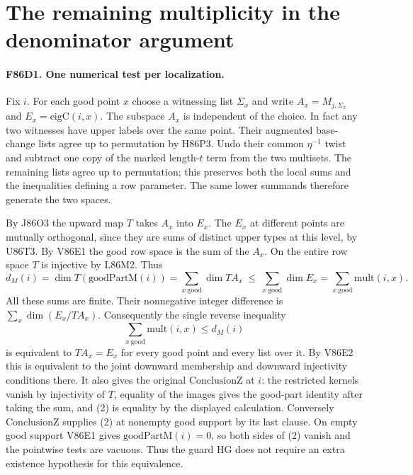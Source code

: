 \section{The remaining multiplicity in the denominator argument}

\paragraph{F86D1. One numerical test per localization.}
Fix $i$. For each good point $x$ choose a witnessing list $\Sigma_x$
and write $A_x=M_{j,\Sigma_x}$ and $E_x=\mathrm{eigC}(i,x)$.
The subspace $A_x$ is independent of the choice. In fact any two
witnesses have upper labels over the same point. Their augmented
base-change lists agree up to permutation by H86P3. Undo their common
$\eta^{-1}$ twist and subtract one copy of the marked length-$t$
term from the two multisets. The remaining lists agree up to
permutation; this preserves both the local sums and the inequalities
defining a row parameter. The same lower summands therefore generate
the two spaces.

By J86O3 the upward map $T$ takes $A_x$ into $E_x$.
The $E_x$ at different points are mutually orthogonal, since they are
sums of distinct upper types at this level, by U86T3. By V86E1 the
good row space is the sum of the $A_x$. On the entire row space $T$
is injective by L86M2. Thus
\[
 d_M(i)=\dim T(\mathrm{goodPartM}(i))
       =\sum_{x\ \mathrm{good}}\dim TA_x
       \ \le\ \sum_{x\ \mathrm{good}}\dim E_x
       =\sum_{x\ \mathrm{good}}\mathrm{mult}(i,x).
\]
All these sums are finite. Their nonnegative integer difference
is $\sum_x\dim(E_x/TA_x)$. Consequently the single reverse inequality
\[
             \sum_{x\ \mathrm{good}}\mathrm{mult}(i,x)\le d_M(i)
             \tag{2}
\]
is equivalent to $TA_x=E_x$ for every good point and every list over
it. By V86E2 this is equivalent to the joint downward membership and
downward injectivity conditions there. It also gives the original
$\mathrm{ConclusionZ}$ at $i$: the restricted kernels vanish by
injectivity of $T$, equality of the images gives the good-part
identity after taking the sum, and (2) is equality by the displayed
calculation. Conversely $\mathrm{ConclusionZ}$ supplies (2) at
nonempty good support by its last clause. On empty good support
V86E1 gives $\mathrm{goodPartM}(i)=0$, so both sides of (2) vanish
and the pointwise tests are vacuous. Thus the guard $\mathrm{HG}$
does not require an extra existence hypothesis for this equivalence.

